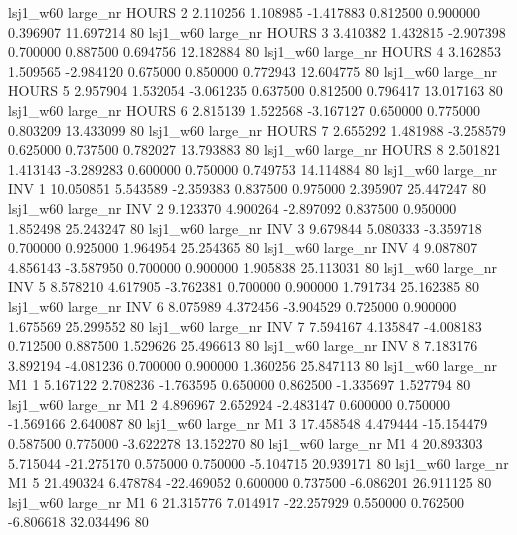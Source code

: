     lsj1_w60   large_nr    HOURS                 2  2.110256  1.108985  -1.417883 0.812500 0.900000  0.396907   11.697214 80
    lsj1_w60   large_nr    HOURS                 3  3.410382  1.432815  -2.907398 0.700000 0.887500  0.694756   12.182884 80
    lsj1_w60   large_nr    HOURS                 4  3.162853  1.509565  -2.984120 0.675000 0.850000  0.772943   12.604775 80
    lsj1_w60   large_nr    HOURS                 5  2.957904  1.532054  -3.061235 0.637500 0.812500  0.796417   13.017163 80
    lsj1_w60   large_nr    HOURS                 6  2.815139  1.522568  -3.167127 0.650000 0.775000  0.803209   13.433099 80
    lsj1_w60   large_nr    HOURS                 7  2.655292  1.481988  -3.258579 0.625000 0.737500  0.782027   13.793883 80
    lsj1_w60   large_nr    HOURS                 8  2.501821  1.413143  -3.289283 0.600000 0.750000  0.749753   14.114884 80
    lsj1_w60   large_nr      INV                 1 10.050851  5.543589  -2.359383 0.837500 0.975000  2.395907   25.447247 80
    lsj1_w60   large_nr      INV                 2  9.123370  4.900264  -2.897092 0.837500 0.950000  1.852498   25.243247 80
    lsj1_w60   large_nr      INV                 3  9.679844  5.080333  -3.359718 0.700000 0.925000  1.964954   25.254365 80
    lsj1_w60   large_nr      INV                 4  9.087807  4.856143  -3.587950 0.700000 0.900000  1.905838   25.113031 80
    lsj1_w60   large_nr      INV                 5  8.578210  4.617905  -3.762381 0.700000 0.900000  1.791734   25.162385 80
    lsj1_w60   large_nr      INV                 6  8.075989  4.372456  -3.904529 0.725000 0.900000  1.675569   25.299552 80
    lsj1_w60   large_nr      INV                 7  7.594167  4.135847  -4.008183 0.712500 0.887500  1.529626   25.496613 80
    lsj1_w60   large_nr      INV                 8  7.183176  3.892194  -4.081236 0.700000 0.900000  1.360256   25.847113 80
    lsj1_w60   large_nr       M1                 1  5.167122  2.708236  -1.763595 0.650000 0.862500 -1.335697    1.527794 80
    lsj1_w60   large_nr       M1                 2  4.896967  2.652924  -2.483147 0.600000 0.750000 -1.569166    2.640087 80
    lsj1_w60   large_nr       M1                 3 17.458548  4.479444 -15.154479 0.587500 0.775000 -3.622278   13.152270 80
    lsj1_w60   large_nr       M1                 4 20.893303  5.715044 -21.275170 0.575000 0.750000 -5.104715   20.939171 80
    lsj1_w60   large_nr       M1                 5 21.490324  6.478784 -22.469052 0.600000 0.737500 -6.086201   26.911125 80
    lsj1_w60   large_nr       M1                 6 21.315776  7.014917 -22.257929 0.550000 0.762500 -6.806618   32.034496 80
